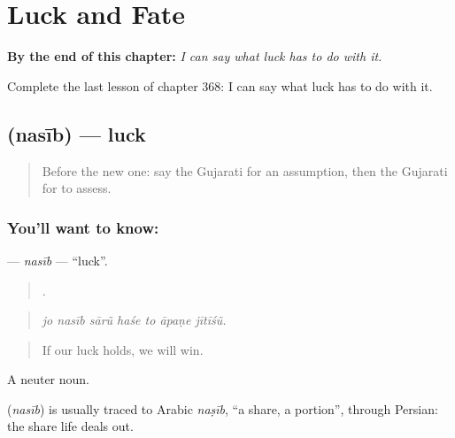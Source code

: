 
\chapter{Luck and Fate}
\label{ch:gu-luck-and-fate}

\begin{chapteropening}
\textbf{By the end of this chapter:} \emph{I can say what luck has to do with it.}

Complete the last lesson of chapter 368: I can say what luck has to do with it.
\end{chapteropening}

\section[\texorpdfstring{\gu{નસીબ} (nasīb)}{નસીબ (nasīb)}]{ (nasīb) — luck}

\label{lesson:GU-C368-nasib}



\begin{quote}
Before the new one: say the Gujarati for an assumption, then the Gujarati for to assess.
\end{quote}

\subsection*{You'll want to know: }
\textbf{} — \emph{nasīb} — \textquotedblleft{}luck\textquotedblright{}.

\begin{quote}
      .
\end{quote}

\begin{quote}
\emph{jo nasīb sārũ haśe to āpaṇe jītīśũ.}
\end{quote}

\begin{quote}
If our luck holds, we will win.
\end{quote}

A neuter noun.

\begin{cousinweb}
\textbf{} (\emph{nasīb}) is usually traced to Arabic \emph{naṣīb}, \textquotedblleft{}a share, a portion\textquotedblright{}, through Persian: the share life deals out.
\end{cousinweb}

